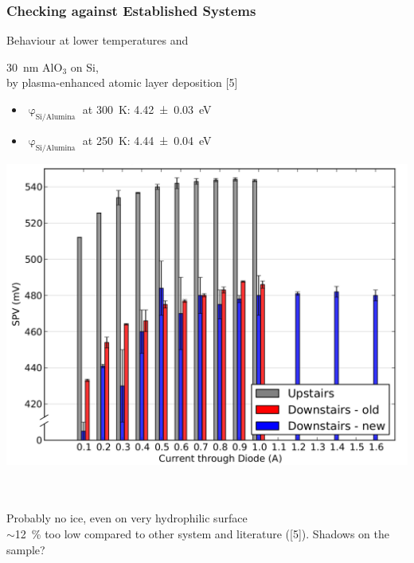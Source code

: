 \documentclass{beamer}
\begin{document}
\begin{frame}
\frametitle{Checking against Established Systems}
\begin{block}{Behaviour at lower temperatures and \spv{}}
\centering
\begin{minipage}{0.4\linewidth}
\centering
\SI{30}{\nano\metre} AlO$_3$ on Si,\\ 
by plasma-enhanced atomic layer deposition \textcolor{RUred}{[5]}
	\begin{itemize}
		\item $\upvarphi_{\text{Si/Alumina}}$ at \SI{300}{\kelvin}: \SI{4.42+-0.03}{\electronvolt}
		\item $\upvarphi_{\text{Si/Alumina}}$ at \SI{250}{\kelvin}: \SI{4.44+-0.04}{\electronvolt}
	\end{itemize}
\end{minipage}
\hfill
\begin{minipage}{0.55\linewidth}
\centering
\vspace{5pt}
	\includegraphics[width=0.9\linewidth]{./figs/pres/currentseries}
\end{minipage}\\[5pt]\hrulefill\\
Probably no ice, even on very hydrophilic surface\\
\spv{} $\sim$\SI{12}{\percent} too low compared to other system and literature (\textcolor{RUred}{[5]}). Shadows on the sample?
\end{block}\end{frame}
\end{document}
